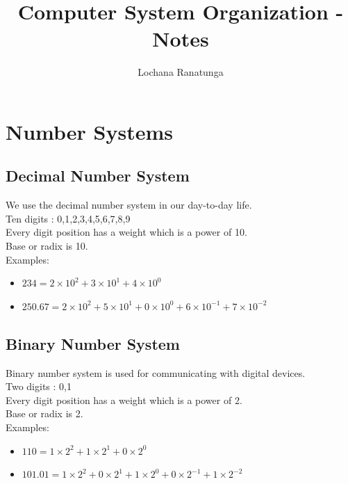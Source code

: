 \documentclass{article}
\begin{document}
\title{Computer System Organization - Notes}
\author{Lochana Ranatunga}
\maketitle

\section{Number Systems}
\subsection*{Decimal Number System}

We use the decimal number system in our day-to-day life.\\
Ten digits : 0,1,2,3,4,5,6,7,8,9\\
Every digit position has a weight which is a power of 10.\\
Base or radix is 10.\\

Examples:
\begin{itemize}
  \item $234 = 2 \times 10^2 + 3 \times 10^1 + 4 \times 10^0$
  \item $250.67 = 2 \times 10^2 + 5 \times 10^1 + 0 \times 10^0 + 6 \times 10^{-1} + 7 \times 10^{-2}$
\end{itemize}

\subsection*{Binary Number System}

Binary number system is used for communicating with digital devices.\\
Two digits : 0,1\\
Every digit position has a weight which is a power of 2.\\
Base or radix is 2.\\

Examples:
\begin{itemize}
  \item $110 = 1 \times 2^2 + 1 \times 2^1 + 0 \times 2^0$
  \item $101.01= 1 \times 2^2 + 0 \times 2^1 + 1 \times 2^0 + 0 \times 2^{-1} + 1 \times 2^{-2}$
\end{itemize}
\end{document}
